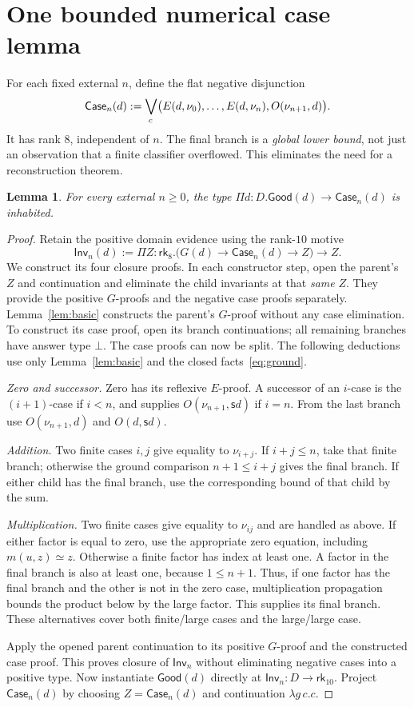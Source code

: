 \documentclass[11pt,a4paper]{article}
\newcommand{\rk}[1]{\mathsf{rk}_{#1}}
\newcommand{\Good}{\mathsf{Good}}
\newcommand{\Case}{\mathsf{Case}}
\newcommand{\Inv}{\mathsf{Inv}}
\newcommand{\ssu}{\mathsf s}
\newcommand{\num}[1]{\nu_{#1}}
\newcommand{\Orc}{\mathop{\bigvee_{\!c}}\displaylimits}
\newtheorem{lemma}[theorem]{Lemma}
\theoremstyle{remark}\newtheorem*{remark}{Remark}
\begin{document}
\section{One bounded numerical case lemma}
For each fixed external $n$, define the flat negative disjunction
\[
 \Case_n(d):=\Orc\bigl(E(d,\num0),\ldots,E(d,\num n),O(\num{n+1},d)\bigr).
\]
It has rank $8$, independent of $n$. The final branch is a \emph{global
lower bound}, not just an observation that a finite classifier overflowed.
This eliminates the need for a reconstruction theorem.

\begin{lemma}\label{lem:cases}
For every external $n\geq0$, the type
$\Pi d:D.\Good(d)\to\Case_n(d)$ is inhabited.
\end{lemma}
\begin{proof}
Retain the positive domain evidence using the rank-$10$ motive
\[
 \Inv_n(d):=\Pi Z:\rk8.\bigl(G(d)\to\Case_n(d)\to Z\bigr)\to Z.
\]
We construct its four closure proofs. In each constructor step, open the
parent's $Z$ and continuation and eliminate the child invariants at that
\emph{same} $Z$. They provide the positive $G$-proofs and the negative case
proofs separately. Lemma~\ref{lem:basic} constructs the parent's $G$-proof
without any case elimination. To construct its case proof, open its branch
continuations; all remaining branches have answer type $\bot$. The case
proofs can now be split. The following deductions use only
Lemma~\ref{lem:basic} and the closed facts~\eqref{eq:ground}.

\emph{Zero and successor.} Zero has its reflexive $E$-proof. A successor of
an $i$-case is the $(i+1)$-case if $i<n$, and supplies
$O(\num{n+1},\ssu d)$ if $i=n$. From the last branch use
$O(\num{n+1},d)$ and $O(d,\ssu d)$.

\emph{Addition.} Two finite cases $i,j$ give equality to $\num{i+j}$.
If $i+j\leq n$, take that finite branch; otherwise the ground comparison
$n+1\leq i+j$ gives the final branch. If either child has the final branch,
use the corresponding bound of that child by the sum.

\emph{Multiplication.} Two finite cases give equality to $\num{ij}$ and are
handled as above. If either factor is equal to zero, use the appropriate
zero equation, including $m(u,z)\simeq z$. Otherwise a finite factor has
index at least one. A factor in the final branch is also at least one,
because $1\leq n+1$. Thus, if one factor has the final branch and the other
is not in the zero case, multiplication propagation bounds the product
below by the large factor. This supplies its final branch. These alternatives
cover both finite/large cases and the large/large case.

Apply the opened parent continuation to its positive $G$-proof and the
constructed case proof. This proves closure of $\Inv_n$ without eliminating
negative cases into a positive type. Now instantiate $\Good(d)$ directly
at $\Inv_n:D\to\rk{10}$. Project $\Case_n(d)$ by choosing
$Z=\Case_n(d)$ and continuation $\lambda g\,c.c$.
\end{proof}
\end{document}
